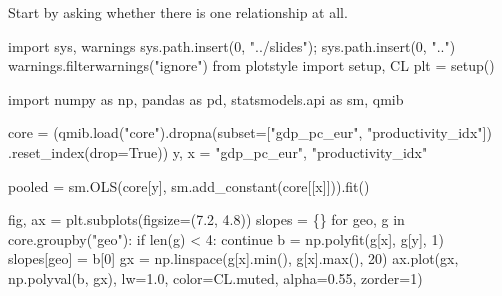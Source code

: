 \documentclass[
  letterpaper,
  10pt,
  twoside,
  openright,
  numbers=noenddot,
  chapterprefix=true]{scrbook}
\newenvironment{Shaded}{}{}
\newcommand{\BuiltInTok}[1]{\textcolor[rgb]{0.84,0.23,0.29}{#1}}
\newcommand{\ControlFlowTok}[1]{\textcolor[rgb]{0.84,0.23,0.29}{#1}}
\newcommand{\DecValTok}[1]{\textcolor[rgb]{0.00,0.36,0.77}{#1}}
\newcommand{\FloatTok}[1]{\textcolor[rgb]{0.00,0.36,0.77}{#1}}
\newcommand{\ImportTok}[1]{\textcolor[rgb]{0.01,0.18,0.38}{#1}}
\newcommand{\KeywordTok}[1]{\textcolor[rgb]{0.84,0.23,0.29}{#1}}
\newcommand{\NormalTok}[1]{\textcolor[rgb]{0.14,0.16,0.18}{#1}}
\newcommand{\OperatorTok}[1]{\textcolor[rgb]{0.14,0.16,0.18}{#1}}
\newcommand{\StringTok}[1]{\textcolor[rgb]{0.01,0.18,0.38}{#1}}
\newcommand{\VariableTok}[1]{\textcolor[rgb]{0.89,0.38,0.04}{#1}}
\begin{document}
Start by asking whether there is one relationship at all.

\begin{Shaded}
\begin{Highlighting}[]
\ImportTok{import}\NormalTok{ sys, warnings}
\NormalTok{sys.path.insert(}\DecValTok{0}\NormalTok{, }\StringTok{"../slides"}\NormalTok{)}\OperatorTok{;}\NormalTok{ sys.path.insert(}\DecValTok{0}\NormalTok{, }\StringTok{".."}\NormalTok{)}
\NormalTok{warnings.filterwarnings(}\StringTok{"ignore"}\NormalTok{)}
\ImportTok{from}\NormalTok{ plotstyle }\ImportTok{import}\NormalTok{ setup, CL}
\NormalTok{plt }\OperatorTok{=}\NormalTok{ setup()}

\ImportTok{import}\NormalTok{ numpy }\ImportTok{as}\NormalTok{ np, pandas }\ImportTok{as}\NormalTok{ pd, statsmodels.api }\ImportTok{as}\NormalTok{ sm, qmib}

\NormalTok{core }\OperatorTok{=}\NormalTok{ (qmib.load(}\StringTok{"core"}\NormalTok{).dropna(subset}\OperatorTok{=}\NormalTok{[}\StringTok{"gdp\_pc\_eur"}\NormalTok{, }\StringTok{"productivity\_idx"}\NormalTok{])}
\NormalTok{        .reset\_index(drop}\OperatorTok{=}\VariableTok{True}\NormalTok{))}
\NormalTok{y, x }\OperatorTok{=} \StringTok{"gdp\_pc\_eur"}\NormalTok{, }\StringTok{"productivity\_idx"}

\NormalTok{pooled }\OperatorTok{=}\NormalTok{ sm.OLS(core[y], sm.add\_constant(core[[x]])).fit()}

\NormalTok{fig, ax }\OperatorTok{=}\NormalTok{ plt.subplots(figsize}\OperatorTok{=}\NormalTok{(}\FloatTok{7.2}\NormalTok{, }\FloatTok{4.8}\NormalTok{))}
\NormalTok{slopes }\OperatorTok{=}\NormalTok{ \{\}}
\ControlFlowTok{for}\NormalTok{ geo, g }\KeywordTok{in}\NormalTok{ core.groupby(}\StringTok{"geo"}\NormalTok{):}
    \ControlFlowTok{if} \BuiltInTok{len}\NormalTok{(g) }\OperatorTok{\textless{}} \DecValTok{4}\NormalTok{:}
        \ControlFlowTok{continue}
\NormalTok{    b }\OperatorTok{=}\NormalTok{ np.polyfit(g[x], g[y], }\DecValTok{1}\NormalTok{)}
\NormalTok{    slopes[geo] }\OperatorTok{=}\NormalTok{ b[}\DecValTok{0}\NormalTok{]}
\NormalTok{    gx }\OperatorTok{=}\NormalTok{ np.linspace(g[x].}\BuiltInTok{min}\NormalTok{(), g[x].}\BuiltInTok{max}\NormalTok{(), }\DecValTok{20}\NormalTok{)}
\NormalTok{    ax.plot(gx, np.polyval(b, gx), lw}\OperatorTok{=}\FloatTok{1.0}\NormalTok{, color}\OperatorTok{=}\NormalTok{CL.muted, alpha}\OperatorTok{=}\FloatTok{0.55}\NormalTok{, zorder}\OperatorTok{=}\DecValTok{1}\NormalTok{)}


\end{Highlighting}
\end{Shaded}
\end{document}
